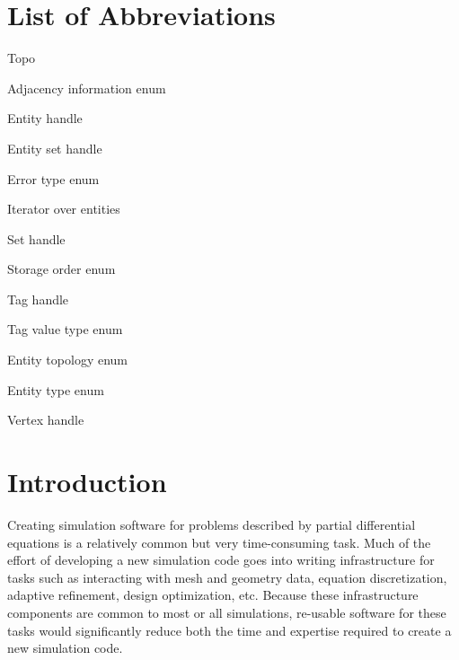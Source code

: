 \section*{List of Abbreviations}
\begin{multicols}{3}
\begin{lyxlist}{Topo}
\item[AI]{Adjacency information enum}
\item[EH]{Entity handle}
\item[ES]{Entity set handle}
\item[ET]{Error type enum}
\item[iter]{Iterator over entities}
\item[SH]{Set handle}
\item[SO]{Storage order enum}
\item[TH]{Tag handle}
\item[TVT]{Tag value type enum}
\item[Topo]{Entity topology enum}
\item[Type]{Entity type enum}
\item[VH]{Vertex handle}
\end{lyxlist}
\end{multicols}

\section{Introduction\label{sec:Introduction}}

Creating simulation software for problems described by partial
differential equations is a relatively common but very time-consuming
task. Much of the effort of developing a new simulation code goes into
writing infrastructure for tasks such as interacting with mesh and
geometry data, equation discretization, adaptive refinement, design
optimization, etc. Because these infrastructure components are common to
most or all simulations, re-usable software for these tasks would
significantly reduce both the time and expertise required to create a
new simulation code.

